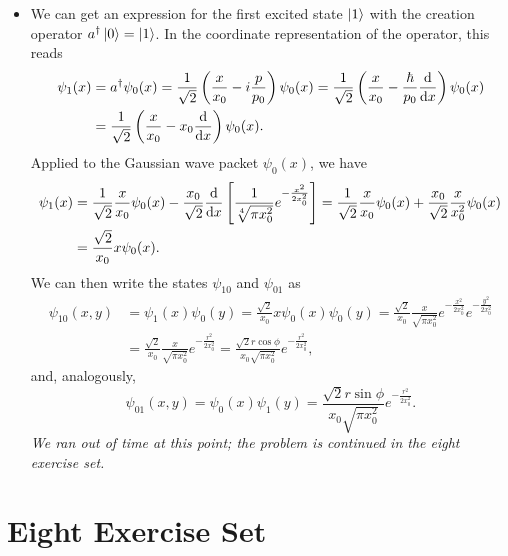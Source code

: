\documentclass[11pt, a4paper]{article}
\begin{document}
\begin{itemize}
	\item We can get an expression for the first excited state $ \ket{1} $ with the creation operator $ a^{\dagger}\ket{0} = \ket{1} $. In the coordinate representation of the operator, this reads
	\begin{align*}
		\psi_{1}(x) &= a^{\dagger}\psi_{0}(x) = \frac{1}{\sqrt{2}}\left(\frac{x}{x_{0}}-i\frac{p}{p_{0}}\right)\psi_{0}(x)  = \frac{1}{\sqrt{2}}\left(\frac{x}{x_{0}}-\frac{\hbar}{p_{0}}\dv{x}\right)\psi_{0}(x) \\
		& = \frac{1}{\sqrt{2}}\left(\frac{x}{x_{0}}-x_{0}\dv{x}\right)\psi_{0}(x).
	\end{align*}
	Applied to the Gaussian wave packet $ \psi_{0}(x) $, we have
	\begin{align*}
		\psi_{1}(x) &= \frac{1}{\sqrt{2}}\frac{x}{x_{0}}\psi_{0}(x) - \frac{x_{0}}{\sqrt{2}}\dv{x}\left[\frac{1}{\sqrt[4]{\pi x_{0}^{2}}}e^{-\frac{x^{2}}{2x_{0}^{2}}}\right] = \frac{1}{\sqrt{2}}\frac{x}{x_{0}}\psi_{0}(x) + \frac{x_{0}}{\sqrt{2}}\frac{x}{x_{0}^{2}}\psi_{0}(x)\\
		&=\frac{\sqrt{2}}{x_{0}}x\psi_{0}(x).
	\end{align*}
	We can then write the states $ \psi_{10} $ and $ \psi_{01} $ as
	\begin{align*}
		\psi_{10}(x, y) &= \psi_{1}(x)\psi_{0}(y) = \frac{\sqrt{2}}{x_{0}}x\psi_{0}(x)\psi_{0}(y) = \frac{\sqrt{2}}{x_{0}} \frac{x}{\sqrt{\pi x_{0}^{2}}}e^{-\frac{x^{2}}{2x_{0}^{2}}} e^{-\frac{y^{2}}{2x_{0}^{2}}}\\
		&=\frac{\sqrt{2}}{x_{0}}\frac{x}{\sqrt{\pi x_{0}^{2}}} e^{-\frac{r^{2}}{2x_{0}^{2}}} = \frac{\sqrt{2}r \cos \phi}{x_{0}\sqrt{\pi x_{0}^{2}}}e^{-\frac{r^{2}}{2x_{0}^{2}}},
	\end{align*}
	and, analogously, 
	\begin{equation*}
		\psi_{01}(x, y) = \psi_{0}(x)\psi_{1}(y) = \frac{\sqrt{2}r \sin \phi}{x_{0}\sqrt{\pi x_{0}^{2}}}e^{-\frac{r^{2}}{2x_{0}^{2}}}.
	\end{equation*}
	\textit{We ran out of time at this point; the problem is continued in the eight exercise set.}
	
\end{itemize}

\section{Eight Exercise Set}
\end{document}
